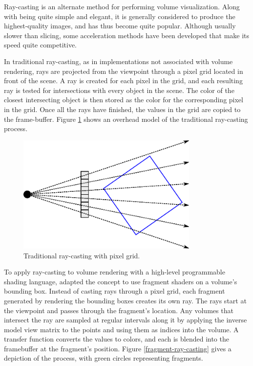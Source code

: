 \documentclass{article}
\begin{document}
Ray-casting is an alternate method for performing volume visualization.  Along
with being quite simple and elegant, it is generally considered to produce the
highest-quality images, and has thus become quite popular.  Although usually
slower than slicing, some acceleration methods have been developed that make its
speed quite competitive.

In traditional ray-casting, as in implementations not associated with volume
rendering, rays are projected from the viewpoint through a pixel grid located in
front of the scene.  A ray is created for each pixel in the grid, and each
resulting ray is tested for intersections with every object in the scene.  The
color of the closest intersecting object is then stored as the color for the
corresponding pixel in the grid.  Once all the rays have finished, the values in
the grid are copied to the frame-buffer.  Figure \ref{traditional-ray-casting}
shows an overhead model of the traditional ray-casting process.

\begin{figure}
\centering
\includegraphics[width=0.8\textwidth]{traditional-ray-casting.pdf}
\caption{Traditional ray-casting with pixel grid.}
\label{traditional-ray-casting}
\end{figure}

To apply ray-casting to volume rendering with a high-level programmable shading
language, \cite{Kruger03} adapted the concept to use fragment shaders on a
volume’s bounding box.  Instead of casting rays through a pixel grid, each
fragment generated by rendering the bounding boxes creates its own ray.  The
rays start at the viewpoint and passes through the fragment’s location.  Any
volumes that intersect the ray are sampled at regular intervals along it by
applying the inverse model view matrix to the points and using them as indices
into the volume.  A transfer function converts the values to colors, and each is
blended into the framebuffer at the fragment’s position.  Figure
\ref{fragment-ray-casting} gives a depiction of the process, with green circles
representing fragments.
\end{document}
